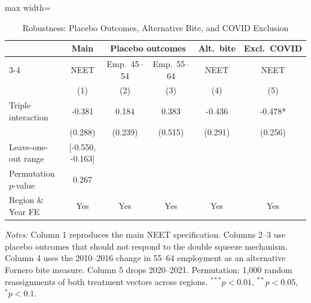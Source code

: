 \begin{table}[t]
\centering
\caption{Robustness: Placebo Outcomes, Alternative Bite, and COVID Exclusion}
\label{tab:robust}
\begin{adjustbox}{max width=\textwidth}
\begin{threeparttable}
\begin{tabular}{lccccc}
\toprule
 & Main & \multicolumn{2}{c}{Placebo outcomes} & Alt.~bite & Excl.~COVID \\
\cmidrule(lr){3-4}
 & NEET & Emp.~45--54 & Emp.~55--64 & NEET & NEET \\
 & (1) & (2) & (3) & (4) & (5) \\
\midrule
Triple interaction & -0.381 & 0.184 & 0.383 & -0.436 & -0.478* \\
 & (0.288) & (0.239) & (0.515) & (0.291) & (0.256) \\
\midrule
Leave-one-out range & [-0.550, -0.163] & & & & \\
Permutation $p$-value & 0.267 & & & & \\
Region \& Year FE & Yes & Yes & Yes & Yes & Yes \\
\bottomrule
\end{tabular}
\begin{tablenotes}[flushleft]
\footnotesize
\item \textit{Notes:} Column 1 reproduces the main NEET specification. Columns 2--3 use placebo outcomes that should not respond to the double squeeze mechanism. Column 4 uses the 2010--2016 change in 55--64 employment as an alternative Fornero bite measure. Column 5 drops 2020--2021. Permutation: 1,000 random reassignments of both treatment vectors across regions. $^{***}p<0.01$, $^{**}p<0.05$, $^{*}p<0.1$.
\end{tablenotes}
\end{threeparttable}
\end{adjustbox}
\end{table}

